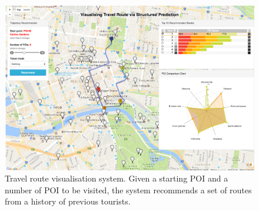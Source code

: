 \documentclass[sigconf]{acmart}
\begin{document}


\maketitle
 


 \begin{figure}
 \centering
   \includegraphics[width=\linewidth]{figure/sample_map2.png}
     \caption{Travel route visualisation system. Given a starting POI and a number of POI to be visited, the system recommends a set of routes from a history of previous tourists.}
   \label{fig:overview}
 \end{figure}
 







 


\end{document}
